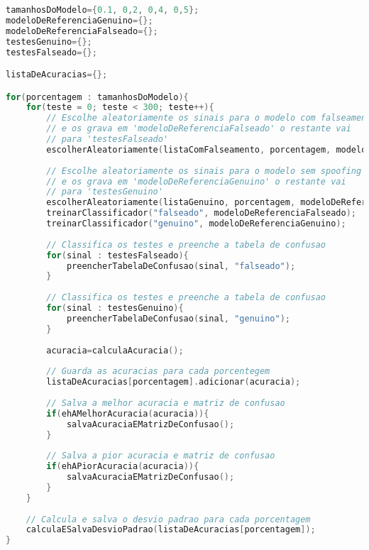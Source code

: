 \begin{lstlisting}[language=C++, caption={Algoritmo que caracteriza o procedimento 03}, captionpos=t, label={lst:experiment03Algo}]
tamanhosDoModelo={0.1, 0,2, 0,4, 0,5};
modeloDeReferenciaGenuino={};
modeloDeReferenciaFalseado={};
testesGenuino={};
testesFalseado={};

listaDeAcuracias={};

for(porcentagem : tamanhosDoModelo){
	for(teste = 0; teste < 300; teste++){
		// Escolhe aleatoriamente os sinais para o modelo com falseamento 
		// e os grava em 'modeloDeReferenciaFalseado' o restante vai 
		// para 'testesFalseado'
		escolherAleatoriamente(listaComFalseamento, porcentagem, modeloDeReferenciaFalseado, testesFalseado);
		
		// Escolhe aleatoriamente os sinais para o modelo sem spoofing
		// e os grava em 'modeloDeReferenciaGenuino' o restante vai 
		// para 'testesGenuino'
		escolherAleatoriamente(listaGenuino, porcentagem, modeloDeReferenciaGenuino, testesGenuino);
		treinarClassificador("falseado", modeloDeReferenciaFalseado);
		treinarClassificador("genuino", modeloDeReferenciaGenuino);
		
		// Classifica os testes e preenche a tabela de confusao
		for(sinal : testesFalseado){
			preencherTabelaDeConfusao(sinal, "falseado");
		} 
		
		// Classifica os testes e preenche a tabela de confusao
		for(sinal : testesGenuino){
			preencherTabelaDeConfusao(sinal, "genuino");
		}
		
		acuracia=calculaAcuracia();
		
		// Guarda as acuracias para cada porcentegem
		listaDeAcuracias[porcentagem].adicionar(acuracia);
		
		// Salva a melhor acuracia e matriz de confusao
		if(ehAMelhorAcuracia(acuracia)){
			salvaAcuraciaEMatrizDeConfusao();
		}
		
		// Salva a pior acuracia e matriz de confusao
		if(ehAPiorAcuracia(acuracia)){
			salvaAcuraciaEMatrizDeConfusao();
		}
	}
	
	// Calcula e salva o desvio padrao para cada porcentagem
	calculaESalvaDesvioPadrao(listaDeAcuracias[porcentagem]);
}
\end{lstlisting}